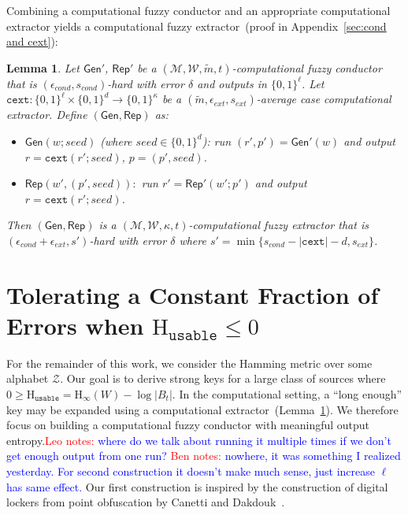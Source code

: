 \documentclass[11pt]{article}
\newcommand{\apref}[1]{\mbox{Appendix~\ref{#1}}}
\newcommand{\lemref}[1]{\mbox{Lemma~\ref{#1}}}
\newcommand{\class}[1]{{\ensuremath{\mathsf{#1}}}}
\newcommand{\gen}{\ensuremath{\class{Gen}}\xspace}
\newcommand{\rep}{\ensuremath{\class{Rep}}\xspace}
\newcommand{\zo}{\ensuremath{\{0, 1\}}}
\newcommand{\Hoo}{\mathrm{H}_\infty}
\newcommand{\Huse}{\mathrm{H}_{\mathtt{usable}}}
\newcommand{\cext}{\ensuremath{\mathtt{cext}}}
\newtheorem{lemma}[theorem]{Lemma}
\newcommand{\authnote}[2]{{\textcolor{red}{\textsf{#1 notes: }\textcolor{blue}{ #2}}\marginpar{\textcolor{red}{\textbf{!!!!!}}}}}
\newcommand{\authnote}[2]{}
\newcommand{\bnote}[1]{{\authnote{Ben}{#1}}}
\newcommand{\lnote}[1]{{\authnote{Leo}{#1}}}
\begin{document}
Combining a computational fuzzy conductor and an appropriate computational extractor yields a computational fuzzy extractor~(proof in \apref{sec:cond and cext}):

\begin{lemma}
\label{lem:cond and cext}
Let $\gen'$, $\rep'$ be a $(\mathcal{M}, \mathcal{W}, \tilde{m}, t)$-computational fuzzy conductor that is $(\epsilon_{cond}, s_{cond})$-hard with error $\delta$ and outputs in $\zo^\ell$.  Let $\cext:\zo^\ell\times \zo^d\rightarrow \zo^\kappa$ be a $(\tilde{m}, \epsilon_{ext}, s_{ext})$-average case computational extractor.  Define $(\gen, \rep)$ as:
\begin{itemize}
\item $\gen(w; seed)$ (where $seed\in \zo^d$): run $(r', p')= \gen'(w)$ and output $r = \cext(r'; seed)$, $p = (p', seed)$. 
\item $\rep(w', (p', seed)):$ run $r' = \rep'(w'; p')$ and output $r = \cext(r'; seed)$.
\end{itemize}
Then $(\gen, \rep)$ is a $(\mathcal{M}, \mathcal{W}, \kappa, t)$-computational fuzzy extractor that is $(\epsilon_{cond}+\epsilon_{ext}, s')$-hard with error $\delta$ where $s' = \min\{s_{cond} - |\cext| -d, s_{ext}\}$.
\end{lemma}


\section{Tolerating a Constant Fraction of Errors when $\Huse\le 0$}
\label{sec:construction}
For the remainder of this work, we consider the Hamming metric over some alphabet $\mathcal{Z}$.  Our goal is to derive strong keys for a large class of sources where $0\ge \Huse = \Hoo(W) - \log|B_t|$.
In the computational setting, a ``long enough'' key may be expanded using a computational extractor~(\lemref{lem:cond and cext}).  We therefore focus on building a computational fuzzy conductor with meaningful output entropy.\lnote{where do we talk about running it multiple times if we don't get enough output from one run?} \bnote{nowhere, it was something I realized yesterday.  For second construction it doesn't make much sense, just increase $\ell$ has same effect.} Our first construction is inspired by the construction of digital lockers from point obfuscation by Canetti and Dakdouk~\cite{canetti2008obfuscating}.
\end{document}
